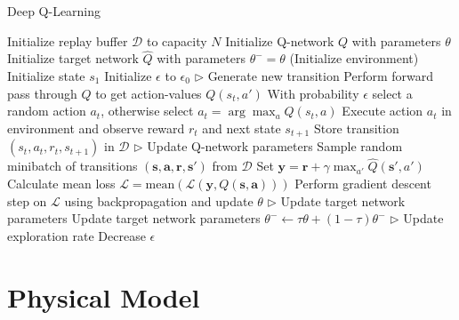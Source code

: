 \begin{algorithm}[h]
    \caption{Deep Q-Learning}
    \label{alg:dqn}
    \begin{algorithmic}
        \State Initialize replay buffer $\mathcal{D}$ to capacity $N$
        \State Initialize Q-network $Q$ with parameters $\theta$
        \State Initialize target network $\hat{Q}$ with parameters $\theta^-=\theta$
        \State (Initialize environment) 
        \State Initialize state $s_1$
        \State Initialize $\epsilon$ to $\epsilon_0$
            \State $\triangleright$ Generate new transition
            \State Perform forward pass through $Q$ to get action-values $Q(s_t, a')$ 
            \State With probability $\epsilon$ select a random action $a_t$, otherwise select $a_t = \arg\!\max_a Q(s_t, a)$
            \State Execute action $a_t$ in environment and observe reward $r_t$ and next state $s_{t+1}$
            \State Store transition $(s_t, a_t, r_t, s_{t+1})$ in $\mathcal{D}$
            \State $\triangleright$ Update Q-network parameters
            \State Sample random minibatch of transitions $(\bm{s}, \bm{a}, \bm{r}, \bm{s'})$ from $\mathcal{D}$
            \State Set $\bm{y} = \bm{r} + \gamma \max_{a'} \hat{Q}(\bm{s'}, a')$
            \State Calculate mean loss $\mathcal{L} = \text{mean}(\mathcal{L}(\bm{y}, Q(\bm{s}, \bm{a})))$
            \State Perform gradient descent step on $\mathcal{L}$ using backpropagation and update $\theta$
            \State $\triangleright$ Update target network parameters
            \State Update target network parameters $\theta^- \gets \tau \theta + (1 - \tau) \theta^-$
            \State $\triangleright$ Update exploration rate
            \State Decrease $\epsilon$   
        \EndFor
    \end{algorithmic}
\end{algorithm}

\chapter{Physical Model}

